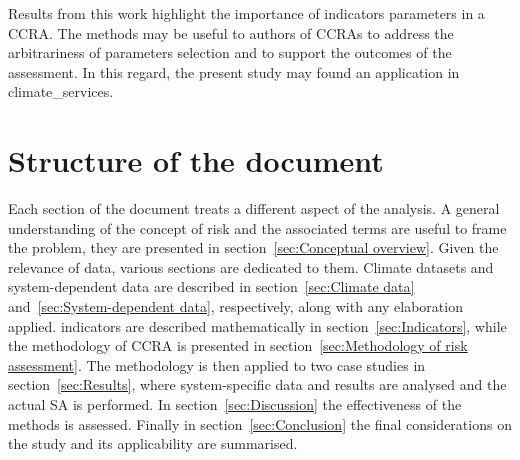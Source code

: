 Results from this work highlight the importance of \glspl{indicator} parameters in a \gls{CCRA}. The methods may be useful to authors of \glspl{CCRA} to address the arbitrariness of parameters selection and to support the outcomes of the assessment. In this regard, the present study may found an application in \glspl{climate_service}.



\section{Structure of the document}
Each section of the document treats a different aspect of the analysis.
A general understanding of the concept of \gls{risk} and the associated terms are useful to frame the problem, they are presented in section~\ref{sec:Conceptual overview}.
Given the relevance of data, various sections are dedicated to them. Climate datasets and system-dependent data are described in section~\ref{sec:Climate data} and~\ref{sec:System-dependent data}, respectively, along with any elaboration applied. \Glspl{indicator} are described mathematically in section~\ref{sec:Indicators}, while the methodology of \gls{CCRA} is presented in section~\ref{sec:Methodology of risk assessment}.
The methodology is then applied to two case studies in section~\ref{sec:Results}, where system-specific data and results are analysed and the actual \gls{SA} is performed.
In section~\ref{sec:Discussion} the effectiveness of the methods is assessed.
Finally in section~\ref{sec:Conclusion} the final considerations on the study and its applicability are summarised.
